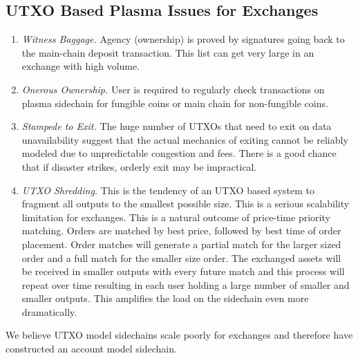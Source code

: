 \documentclass[12pt,a4paper]{article}
\begin{document}
\subsection{UTXO Based Plasma Issues for Exchanges}
\begin{enumerate}
    \item \emph{Witness Baggage.} Agency (ownership) is proved by signatures going back to the main-chain deposit transaction. This list can get very large in an exchange with high volume.
    \item \emph{Onerous Ownership.} User is required to regularly check transactions on plasma sidechain for fungible coins or main chain for non-fungible coins.
    \item \emph{Stampede to Exit.} The huge number of UTXOs that need to exit on data unavailability suggest that the actual mechanics of exiting  cannot be reliably modeled due to unpredictable congestion and fees. There is a good chance that if disaster strikes, orderly exit may be impractical.
    \item \emph{UTXO Shredding.} This is the tendency of an UTXO based system to fragment  all outputs to the smallest possible size. This is a serious scalability limitation for exchanges. This is a natural outcome of price-time priority matching. Orders are matched by best price, followed by best time of order placement. Order matches will generate a partial match for the larger sized order and a full match for the smaller size order. The exchanged assets will be received in smaller outputs with every future match and this process will repeat over time resulting in each user holding a large number of smaller and smaller outputs. This amplifies the load on the sidechain even more dramatically. 
\end{enumerate}

We believe UTXO model sidechains scale poorly for exchanges and therefore have constructed an account model sidechain.
\end{document}
